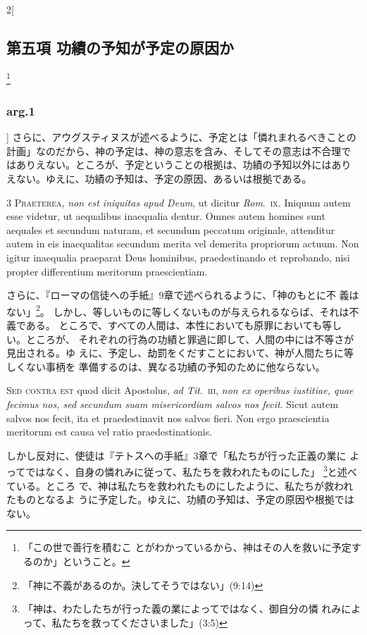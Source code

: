 \documentclass[paper=a4paper,fontsize=10pt,jafontsize=9pt,titlepage]{jlreq}
\begin{document}
\begin{paracol}{2}[\subsection{第五項 功績の予知が予定の原因か}\footnote{「この世で善行を積むこ とがわかっているから、神はその人を救いに予定するのか」ということ。}\subsubsection{arg.1}]
さらに、アウグスティヌスが述べるように、予定とは「憐れまれるべきことの
計画」なのだから、神の予定は、神の意志を含み、そしてその意志は不合理で
はありえない。ところが、予定ということの根拠は、功績の予知以外にはあり
えない。ゆえに、功績の予知は、予定の原因、あるいは根拠である。




{\scshape 3 Praeterea}, {\itshape non est iniquitas apud Deum}, ut
dicitur {\itshape Rom}.~{\scshape ix}. Iniquum autem esse videtur, ut aequalibus inaequalia
dentur. Omnes autem homines sunt aequales et secundum naturam, et
secundum peccatum originale, attenditur autem in eis inaequalitas
secundum merita vel demerita propriorum actuum. Non igitur inaequalia
praeparat Deus hominibus, praedestinando et reprobando, nisi propter
differentium meritorum praescientiam.


\switchcolumn


さらに、『ローマの信徒への手紙』9章で述べられるように、「神のもとに不
義はない」\footnote{「神に不義があるのか。決してそうではない」(9:14)}。
しかし、等しいものに等しくないものが与えられるならば、それは不義である。
ところで、すべての人間は、本性においても原罪においても等しい。ところが、
それぞれの行為の功績と罪過に即して、人間の中には不等さが見出される。ゆ
えに、予定し、劫罰をくだすことにおいて、神が人間たちに等しくない事柄を
準備するのは、異なる功績の予知のために他ならない。


\switchcolumn*[\subsubsection{s.c.}]


{\scshape Sed contra est} quod dicit Apostolus, {\itshape ad
Tit}.~{\scshape iii}, {\itshape non ex operibus iustitiae, quae fecimus nos, sed secundum suam
misericordiam salvos nos fecit}. Sicut autem salvos nos fecit, ita et
praedestinavit nos salvos fieri. Non ergo praescientia meritorum est
causa vel ratio praedestinationis.


\switchcolumn


しかし反対に、使徒は『テトスへの手紙』3章で「私たちが行った正義の業に
よってではなく、自身の憐れみに従って、私たちを救われたものにした」
\footnote{「神は、わたしたちが行った義の業によってではなく、御自分の憐
れみによって、私たちを救ってくださいました」(3:5)}と述べている。ところ
で、神は私たちを救われたものにしたように、私たちが救われたものとなるよ
うに予定した。ゆえに、功績の予知は、予定の原因や根拠ではない。



\end{paracol}
\end{document}
